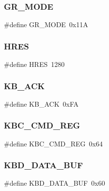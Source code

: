 \subsubsection{\texorpdfstring{G\+R\+\_\+\+M\+O\+DE}{GR\_MODE}}
{\footnotesize\ttfamily \#define G\+R\+\_\+\+M\+O\+DE~0x11A}

\hypertarget{group__mouse_ga327c2a8d523460fa45ca05492a003d56}{}\label{group__mouse_ga327c2a8d523460fa45ca05492a003d56} 
\subsubsection{\texorpdfstring{H\+R\+ES}{HRES}}
{\footnotesize\ttfamily \#define H\+R\+ES~1280}

\hypertarget{group__mouse_ga0349a2901e942eb948442081d0aedc96}{}\label{group__mouse_ga0349a2901e942eb948442081d0aedc96} 
\subsubsection{\texorpdfstring{K\+B\+\_\+\+A\+CK}{KB\_ACK}}
{\footnotesize\ttfamily \#define K\+B\+\_\+\+A\+CK~0x\+FA}

\hypertarget{group__mouse_ga6d57c7927a10f638c83046b52c8caac9}{}\label{group__mouse_ga6d57c7927a10f638c83046b52c8caac9} 
\subsubsection{\texorpdfstring{K\+B\+C\+\_\+\+C\+M\+D\+\_\+\+R\+EG}{KBC\_CMD\_REG}}
{\footnotesize\ttfamily \#define K\+B\+C\+\_\+\+C\+M\+D\+\_\+\+R\+EG~0x64}

\hypertarget{group__mouse_ga95745d05db38ca00871939ef479aeb56}{}\label{group__mouse_ga95745d05db38ca00871939ef479aeb56} 
\subsubsection{\texorpdfstring{K\+B\+D\+\_\+\+D\+A\+T\+A\+\_\+\+B\+UF}{KBD\_DATA\_BUF}}
{\footnotesize\ttfamily \#define K\+B\+D\+\_\+\+D\+A\+T\+A\+\_\+\+B\+UF~0x60}

